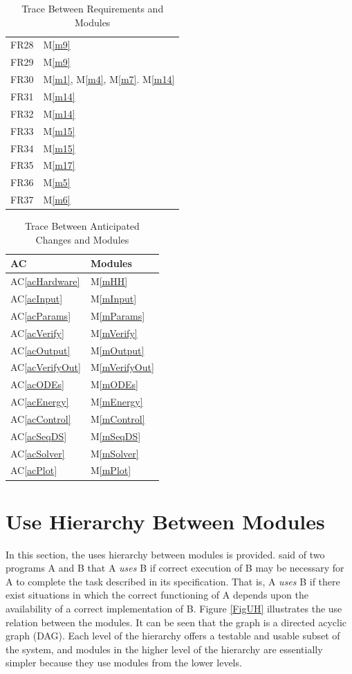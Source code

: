 \documentclass[12pt, titlepage]{article}
\newcommand{\acref}[1]{AC\ref{#1}}
\newcommand{\mref}[1]{M\ref{#1}}
\begin{document}
\begin{table}[H]
\begin{tabular}{p{} p{}}
		FR28 & \mref{m9}\\
		FR29 & \mref{m9}\\
		FR30 & \mref{m1}, \mref{m4}, \mref{m7}. \mref{m14}\\
		FR31 & \mref{m14}\\
		FR32 & \mref{m14}\\
		FR33 & \mref{m15}\\
		FR34 & \mref{m15}\\
		FR35 & \mref{m17}\\
		FR36 & \mref{m5}\\
		FR37 & \mref{m6}\\
		\bottomrule
	\end{tabular}
	\caption{Trace Between Requirements and Modules}
	\label{TblRT}
\end{table}

\begin{table}[H]
	\centering
	\begin{tabular}{p{} p{}}
		\toprule
		\textbf{AC} & \textbf{Modules}\\
		\midrule
		\acref{acHardware} & \mref{mHH}\\
		\acref{acInput} & \mref{mInput}\\
		\acref{acParams} & \mref{mParams}\\
		\acref{acVerify} & \mref{mVerify}\\
		\acref{acOutput} & \mref{mOutput}\\
		\acref{acVerifyOut} & \mref{mVerifyOut}\\
		\acref{acODEs} & \mref{mODEs}\\
		\acref{acEnergy} & \mref{mEnergy}\\
		\acref{acControl} & \mref{mControl}\\
		\acref{acSeqDS} & \mref{mSeqDS}\\
		\acref{acSolver} & \mref{mSolver}\\
		\acref{acPlot} & \mref{mPlot}\\
		\bottomrule
	\end{tabular}
	\caption{Trace Between Anticipated Changes and Modules}
	\label{TblACT}
\end{table}

\section{Use Hierarchy Between Modules} \label{SecUse}

In this section, the uses hierarchy between modules is
provided. \citet{Parnas1978} said of two programs A and B that A {\em uses} B if
correct execution of B may be necessary for A to complete the task described in
its specification. That is, A {\em uses} B if there exist situations in which
the correct functioning of A depends upon the availability of a correct
implementation of B.  Figure \ref{FigUH} illustrates the use relation between
the modules. It can be seen that the graph is a directed acyclic graph
(DAG). Each level of the hierarchy offers a testable and usable subset of the
system, and modules in the higher level of the hierarchy are essentially simpler
because they use modules from the lower levels.
\end{document}
